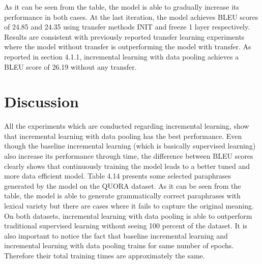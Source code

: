 As it can be seen from the table, the model is able to gradually increase its performance in both cases. At the last iteration, the model achieves BLEU scores of 24.85 and 24.35 using transfer methods INIT and freeze 1 layer respectively. Results are consistent with previously reported transfer learning experiments where the model without transfer is outperforming the model with transfer. As reported in section 4.1.1, incremental learning with data pooling achieves a BLEU score of 26.19 without any transfer.  

\section{Discussion}

All the experiments which are conducted regarding incremental learning, show that incremental learning with data pooling has the best performance. Even though the baseline incremental learning (which is basically supervised learning) also increase its performance through time, the difference between BLEU scores clearly shows that continuously training the model leads to a better tuned and more data efficient model. Table 4.14 presents some selected paraphrases generated by the model on the QUORA dataset. As it can be seen from the table, the model is able to generate grammatically correct paraphrases with lexical variety but there are cases where it fails to capture the original meaning. On both datasets, incremental learning with data pooling is able to outperform traditional supervised learning without seeing 100 percent of the dataset. It is also important to notice the fact that baseline incremental learning and incremental learning with data pooling trains for same number of epochs. Therefore their total training times are approximately the same. 

